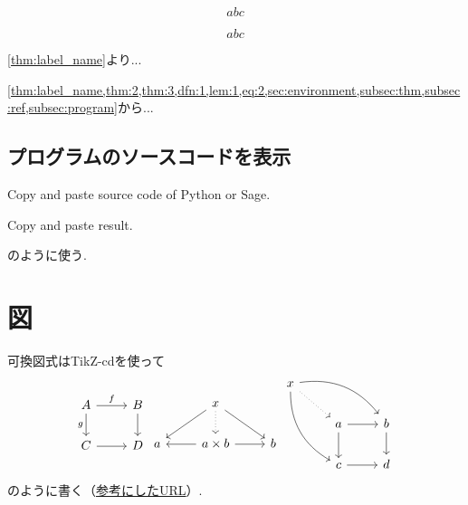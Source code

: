 \documentclass[11pt,a4paper,oneside,lualatex]{ltjsarticle} %
\numberwithin{equation}{section} %
\begin{document}
\begin{equation} \label{eq:1}
	abc
\end{equation}

\begin{equation} \label{eq:2}
	abc
\end{equation}

\cref{thm:label_name}より... 

\cref{thm:label_name,thm:2,thm:3,dfn:1,lem:1,eq:2,sec:environment,subsec:thm,subsec:ref,subsec:program}から...


\subsection{プログラムのソースコードを表示} \label{subsec:program}


\begin{Python}
Copy and paste source code of Python or Sage.
\end{Python}
\begin{result}
Copy and paste result.
\end{result}
のように使う.


\section{図} \label{sec:diag}


可換図式はTikZ-cdを使って
\begin{equation}
	\begin{tikzcd}
		A \ar[r, "f"] \arrow[d, "g"'] & B \ar[d] \\
		C \ar[r] & D
	\end{tikzcd}
	\begin{tikzcd}
		& x \arrow[ld] \arrow[d, dotted] \arrow[rd] & \\
		a & a\times b \arrow[l] \arrow[r] & b
	\end{tikzcd}
	\begin{tikzcd}
		x \arrow[ddr, bend right] \arrow[rrd, bend left] \arrow[rd, dotted] & & \\
		& a \arrow[r] \arrow[d] & b \arrow[d] \\
		& c \arrow[r] & d
	\end{tikzcd}
\end{equation}
のように書く（\href{https://blog.miz-ar.info/2017/06/commutative-diagrams-in-latex/}{参考にしたURL}）.
\end{document}
